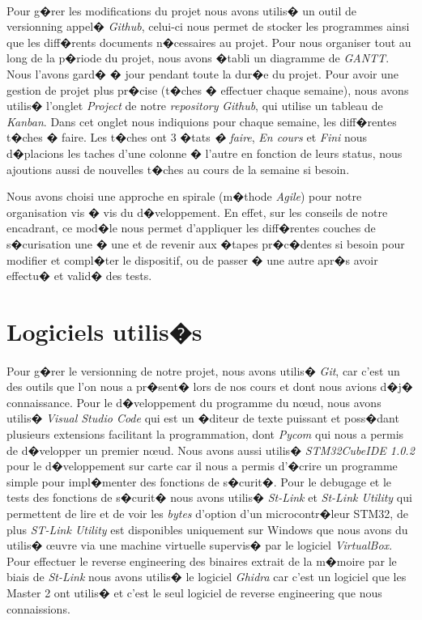 \documentclass[a4paper, titlepage,12pt]{report}
\begin{document}
\paragraph{}
Pour g�rer les modifications du projet nous avons utilis� un outil de versionning appel� \textit{Github}, celui-ci nous permet de stocker les programmes ainsi que les diff�rents documents n�cessaires au projet.
Pour nous organiser tout au long de la p�riode du projet, nous avons �tabli un diagramme de \textit{GANTT}. Nous l'avons gard� � jour pendant toute la dur�e du projet. Pour avoir une gestion de projet plus pr�cise (t�ches � effectuer chaque semaine), nous avons utilis� l'onglet \textit{Project} de notre \textit{repository} \textit{Github}, qui utilise un tableau de \textit{Kanban}. Dans cet onglet nous indiquions pour chaque semaine, les diff�rentes t�ches � faire. Les t�ches ont 3 �tats \textit{� faire}, \textit{En cours} et \textit{Fini} nous d�placions les taches d'une colonne � l'autre en fonction de leurs status, nous ajoutions aussi de nouvelles t�ches au cours de la semaine si besoin.

Nous avons choisi une approche en spirale (m�thode \textit{Agile}) pour notre organisation vis � vis du d�veloppement. En effet, sur les conseils de notre encadrant, ce mod�le nous permet d'appliquer les diff�rentes couches de s�curisation une � une et de revenir aux �tapes pr�c�dentes si besoin pour modifier et compl�ter le dispositif, ou de passer � une autre apr�s avoir effectu� et valid� des tests.

\section{Logiciels utilis�s}
\paragraph{}
Pour g�rer le versionning de notre projet, nous avons utilis� \textit{Git}, car c'est un des outils que l'on nous a pr�sent� lors de nos cours et dont nous avions d�j� connaissance. Pour le d�veloppement du programme du n\oe{}ud, nous avons utilis� \textit{Visual Studio Code} qui est un �diteur de texte puissant et poss�dant plusieurs extensions facilitant la programmation, dont \textit{Pycom} qui nous a permis de d�velopper un premier n\oe{}ud. Nous avons aussi utilis� \textit{STM32CubeIDE 1.0.2} pour le d�veloppement sur carte car il nous a permis d'�crire un programme simple pour impl�menter des fonctions de s�curit�. Pour le debugage et le tests des fonctions de s�curit� nous avons utilis� \textit{St-Link} et \textit{St-Link Utility} qui permettent de lire et de voir les \textit{bytes} d'option d'un microcontr�leur STM32, de plus \textit{ST-Link Utility} est disponibles uniquement sur Windows que nous avons du utilis� \oe{}uvre via une machine virtuelle supervis� par le logiciel \textit{VirtualBox}. Pour effectuer le reverse engineering des binaires extrait de la m�moire par le biais de \textit{St-Link} nous avons utilis� le logiciel \textit{Ghidra} car c'est un logiciel que les Master 2 ont utilis� et c'est le seul logiciel de reverse engineering que nous connaissions.
\end{document}
